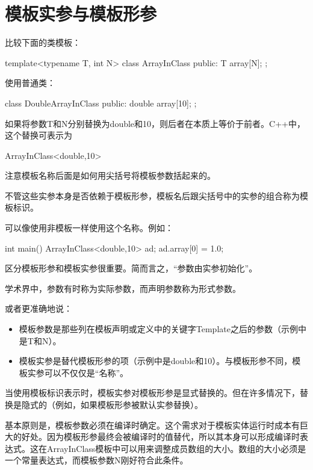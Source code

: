 \section{模板实参与模板形参}

比较下面的类模板：

\begin{cpp}
template<typename T, int N>
class ArrayInClass {
	public:
	T array[N];
};
\end{cpp}

使用普通类：

\begin{cpp}
class DoubleArrayInClass {
	public:
	double array[10];
};
\end{cpp}

如果将参数T和N分别替换为double和10，则后者在本质上等价于前者。C++中，这个替换可表示为

\begin{cpp}
ArrayInClass<double,10>
\end{cpp}

注意模板名称后面是如何用尖括号将模板参数括起来的。

不管这些实参本身是否依赖于模板形参，模板名后跟尖括号中的实参的组合称为模板标识。

可以像使用非模板一样使用这个名称。例如：

\begin{cpp}
int main()
{
	ArrayInClass<double,10> ad;
	ad.array[0] = 1.0;
}
\end{cpp}

区分模板形参和模板实参很重要。简而言之，“参数由实参初始化”。

\begin{notice}
学术界中，参数有时称为实际参数，而声明参数称为形式参数。
\end{notice}

或者更准确地说：

\begin{itemize}
\item 
模板参数是那些列在模板声明或定义中的关键字Template之后的参数（示例中是T和N）。

\item 
模板实参是替代模板形参的项（示例中是double和10）。与模板形参不同，模板实参可以不仅仅是“名称”。
\end{itemize}

当使用模板标识表示时，模板实参对模板形参是显式替换的。但在许多情况下，替换是隐式的（例如，如果模板形参被默认实参替换）。

基本原则是，模板参数必须在编译时确定。这个需求对于模板实体运行时成本有巨大的好处。因为模板形参最终会被编译时的值替代，所以其本身可以形成编译时表达式。这在ArrayInClass模板中可以用来调整成员数组的大小。数组的大小必须是一个常量表达式，而模板参数N刚好符合此条件。

